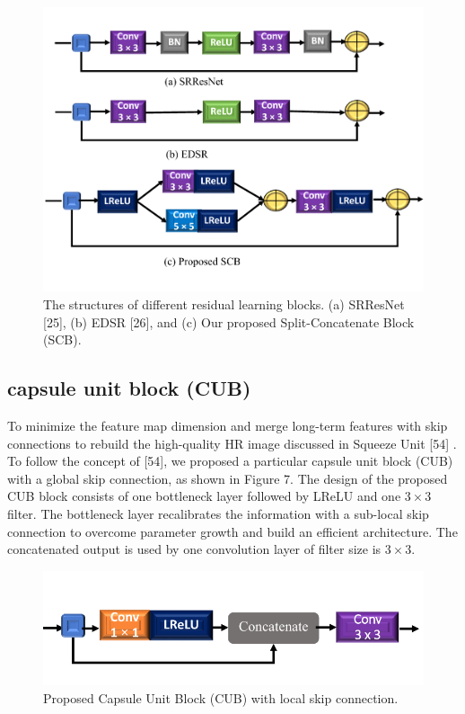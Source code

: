 \documentclass{ieeeaccess}
\begin{document}
\begin{figure}[ht]
  \includegraphics[width=\linewidth]{6FIGURE.pdf}
  \caption{The structures of different residual learning blocks. (a) SRResNet [25], (b) EDSR [26], and (c) Our proposed Split-Concatenate Block (SCB).}
  \label{fig:7}
\end{figure}



\subsection{capsule unit block (CUB)}
To minimize the feature map dimension and merge long-term features with skip connections to rebuild the high-quality HR image discussed in Squeeze Unit [54] . To follow the concept of [54], we proposed a particular capsule unit block (CUB) with a global skip connection, as shown in Figure 7. The design of the proposed CUB block consists of one bottleneck layer followed by LReLU and one $3\times3$ filter. The bottleneck layer recalibrates the information with a sub-local skip connection to overcome parameter growth and build an efficient architecture. The concatenated output is used by one convolution layer of filter size is $3\times3$.


\begin{figure}[ht]
  \includegraphics[width=\linewidth]{7FIGURE.pdf}
  \caption{Proposed Capsule Unit Block (CUB) with local skip connection.}
  \label{fig:7}
\end{figure}
\end{document}
